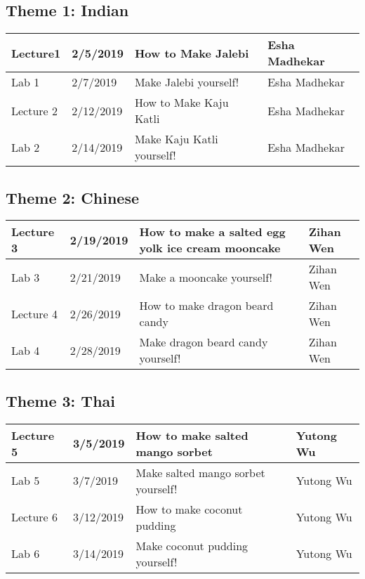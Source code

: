 \documentclass{article}
\begin{document}
\subsection*{Theme 1: Indian}
\vspace{0.5em} \begin{tabular}{|l|l|l|l|}
\hline 
 Lecture1 &  2/5/2019 & How to Make Jalebi & Esha Madhekar\\
\hline
 Lab 1 &  2/7/2019 & Make Jalebi yourself! & Esha Madhekar\\
\hline
Lecture 2 &  2/12/2019 & How to Make Kaju Katli & Esha Madhekar\\
\hline 
Lab 2 & 2/14/2019 & Make Kaju Katli yourself! & Esha Madhekar\\
\hline
\end{tabular}

\subsection*{Theme 2: Chinese }
\vspace{0.5em} \begin{tabular}{|l|l|l|l|}
\hline 
Lecture 3 & 2/19/2019 & How to make a salted egg yolk ice cream mooncake & Zihan Wen\\
\hline
Lab 3 & 2/21/2019 & Make a mooncake yourself!& Zihan Wen\\
\hline
Lecture 4 & 2/26/2019 & How to make dragon beard candy & Zihan Wen\\
\hline 
Lab 4 & 2/28/2019 & Make dragon beard candy yourself!& Zihan Wen\\
\hline
\end{tabular}


 \subsection*{Theme 3: Thai }
 \vspace{0.5em} \begin{tabular}{|l|l|l|l|}
\hline 
Lecture 5 & 3/5/2019 & How to make salted mango sorbet
 & Yutong Wu\\
\hline
Lab 5 & 3/7/2019 & Make salted mango sorbet yourself!& Yutong Wu\\
\hline
Lecture 6 & 3/12/2019 & How to make coconut pudding & Yutong Wu\\
\hline 
Lab 6 & 3/14/2019 & Make coconut pudding yourself!& Yutong Wu\\
\hline
\end{tabular}
\end{document}
